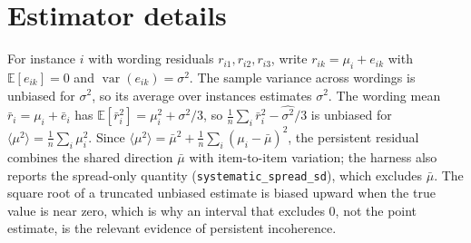 \documentclass[11pt]{article}
\begin{document}
\section{Estimator details}

For instance $i$ with wording residuals $r_{i1},r_{i2},r_{i3}$, write $r_{ik}=\mu_i+e_{ik}$ with $\mathbb{E}[e_{ik}]=0$ and $\operatorname{var}(e_{ik})=\sigma^2$. The sample variance across wordings is unbiased for $\sigma^2$, so its average over instances estimates $\sigma^2$. The wording mean $\bar r_i=\mu_i+\bar e_i$ has $\mathbb{E}[\bar r_i^2]=\mu_i^2+\sigma^2/3$, so $\frac1n\sum_i\bar r_i^2-\widehat{\sigma^2}/3$ is unbiased for $\langle\mu^2\rangle=\frac1n\sum_i\mu_i^2$. Since $\langle\mu^2\rangle=\bar\mu^2+\frac1n\sum_i(\mu_i-\bar\mu)^2$, the persistent residual combines the shared direction $\bar\mu$ with item-to-item variation; the harness also reports the spread-only quantity (\texttt{systematic\_spread\_sd}), which excludes $\bar\mu$. The square root of a truncated unbiased estimate is biased upward when the true value is near zero, which is why an interval that excludes 0, not the point estimate, is the relevant evidence of persistent incoherence.
\end{document}
